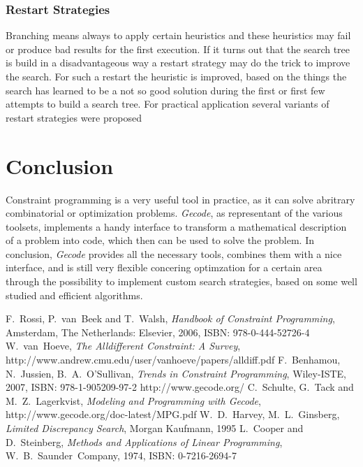 \documentclass[10pt,
               a4paper,
               journal,
               ]{IEEEtran}
\begin{document}
	\subsubsection{Restart Strategies}
	Branching means always to apply certain heuristics and these heuristics may fail or produce bad results for the first execution. If it turns out that the search tree is build in a disadvantageous way a restart strategy may do the trick to improve the search. For such a restart the heuristic is improved, based on the things the search has learned to be a not so good solution during the first or first few attempts to build a search tree.
	For practical application several variants of restart strategies were proposed \cite[p.~113]{handbookCP}
	
	\section{Conclusion}
	Constraint programming is a very useful tool in practice, as it can solve abritrary combinatorial or optimization problems. \emph{Gecode}, as representant of the various toolsets, implements a handy interface to transform a mathematical description of a problem into code, which then can be used to solve the problem. In conclusion, \emph{Gecode} provides all the necessary tools, combines them with a nice interface, and is still very flexible concering optimzation for a certain area through the possibility to implement custom search strategies, based on some well studied and efficient algorithms.
	
	\begin{thebibliography}{1}
		F.~Rossi, P.~van~Beek and T.~Walsh, \emph{Handbook of Constraint Programming}, Amsterdam, The Netherlands: Elsevier, 2006, ISBN: 978-0-444-52726-4
		W.~van~Hoeve, \emph{The Alldifferent Constraint: A Survey}, http://www.andrew.cmu.edu/user/vanhoeve/papers/alldiff.pdf
		F.~Benhamou, N.~Jussien, B.~A.~O'Sullivan, \emph{Trends in Constraint Programming}, Wiley-ISTE, 2007, ISBN: 978-1-905209-97-2
		http://www.gecode.org/
		C.~Schulte, G.~Tack and M.~Z.~Lagerkvist, \emph{Modeling and Programming with Gecode}, http://www.gecode.org/doc-latest/MPG.pdf
		W.~D.~Harvey, M.~L.~Ginsberg, \emph{Limited Discrepancy Search}, Morgan Kaufmann, 1995
		L.~Cooper and D.~Steinberg, \emph{Methods and Applications of Linear Programming}, W.~B.~Saunder~Company, 1974, ISBN: 0-7216-2694-7
	\end{thebibliography}
\end{document}
